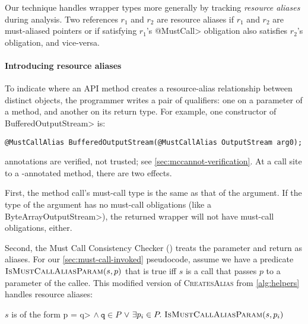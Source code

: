 Our technique handles wrapper types more generally by tracking \emph{resource
aliases} during analysis.  Two references $r_1$ and $r_2$ are resource aliases
if $r_1$ and $r_2$ are must-aliased pointers or if
satisfying $r_1$'s \<@MustCall> obligation also satisfies $r_2$'s
  obligation, and vice-versa.

\paragraph{Introducing resource aliases}
To indicate where an API method creates a resource-alias
relationship between distinct objects, the programmer writes a pair of 
\mccannot qualifiers:  one on a parameter
of a method, and another on its return type.
For example, one constructor of \<BufferedOutputStream> is:
\begin{lstlisting}
@MustCallAlias BufferedOutputStream(@MustCallAlias OutputStream arg0);
\end{lstlisting}

\noindent
\mccannot annotations are verified, not trusted; see \cref{sec:mccannot-verification}.
At a call site to a \mccannot-annotated method, there are two effects.

First, the method call's must-call type is the same as that of the
argument.  If the type of the argument has no must-call obligations (like a
\<ByteArrayOutputStream>), the returned wrapper will not have must-call
obligations, either.

Second,
the Must Call Consistency Checker
() treats the \mccannot parameter and return as
aliases.  For our \cref{sec:must-call-invoked} pseudocode, assume we have a
predicate $\textsc{IsMust\-CallAliasParam}(s,p)$ that is true iff $s$ is a call that
passes $p$ to a \mccannot parameter of the callee.
This modified
version of \textsc{CreatesAlias} from \cref{alg:helpers} handles resource aliases:
\begin{algorithmic}
    \State \Return $s$ is of the form \<p = q> $\wedge\ \mathtt{q} \in P$ \newline
         \hspace*{4.5em} $\vee\ \exists p_i \in P.\ \textsc{IsMustCallAliasParam}(s,p_i)$ 
    \EndProcedure
\end{algorithmic}


